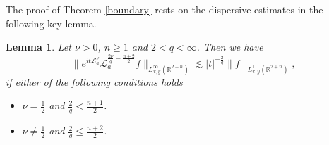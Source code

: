 \documentclass[a4paper,11pt, reqno]{amsart}
\numberwithin{equation}{section}
\theoremstyle{plain}
\newtheorem{lemma}[theorem]{Lemma}
\theoremstyle{definition}
\theoremstyle{remark}
\begin{document}
The proof of Theorem \ref{boundary} rests on the dispersive estimates in the following key lemma.
\begin{lemma}\label{key lemma}
Let $\nu>0$, $n\geq 1$ and $2<q<\infty$. Then we have
\begin{equation}
\|e^{it\mathcal{L}_a^\nu} \mathcal{L}_a^{\frac{2\nu}{q}-\frac{n+2}{2}}f\|_{L_{x,y}^\infty(\mathbb{R}^{2+n})}\lesssim |t|^{-\frac{2}{q}}\|f\|_{L_{x,y}^1(\mathbb{R}^{2+n})},
\end{equation}
if either of the following conditions holds
\begin{itemize}
\item $\nu=\frac{1}{2}$ and $\frac{2}{q}<\frac{n+1}{2}$.
\item $\nu\not=\frac{1}{2}$ and $\frac{2}{q}\leq\frac{n+2}{2}$.
\end{itemize}
\end{lemma}
\end{document}

